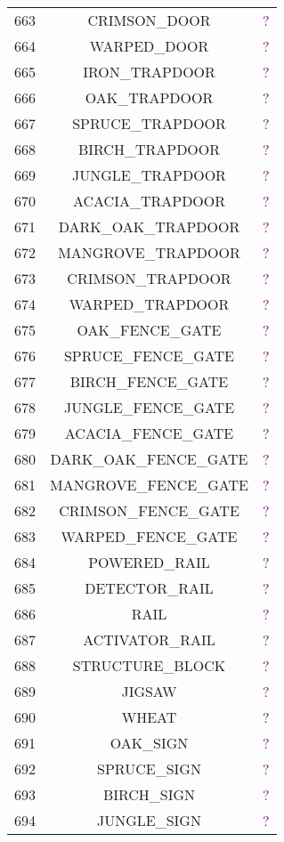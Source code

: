\documentclass[11pt]{article}
\newcommand\myworries[1]{\textcolor{purple}{#1}}
\begin{document}
\begin{longtable}{ |c|c|c| }
	663 & CRIMSON\_DOOR & \myworries{?} \\
	664 & WARPED\_DOOR & \myworries{?} \\
	665 & IRON\_TRAPDOOR & \myworries{?} \\
	666 & OAK\_TRAPDOOR & \myworries{?} \\
	667 & SPRUCE\_TRAPDOOR & \myworries{?} \\
	668 & BIRCH\_TRAPDOOR & \myworries{?} \\
	669 & JUNGLE\_TRAPDOOR & \myworries{?} \\
	670 & ACACIA\_TRAPDOOR & \myworries{?} \\
	671 & DARK\_OAK\_TRAPDOOR & \myworries{?} \\
	672 & MANGROVE\_TRAPDOOR & \myworries{?} \\
	673 & CRIMSON\_TRAPDOOR & \myworries{?} \\
	674 & WARPED\_TRAPDOOR & \myworries{?} \\
	675 & OAK\_FENCE\_GATE & \myworries{?} \\
	676 & SPRUCE\_FENCE\_GATE & \myworries{?} \\
	677 & BIRCH\_FENCE\_GATE & \myworries{?} \\
	678 & JUNGLE\_FENCE\_GATE & \myworries{?} \\
	679 & ACACIA\_FENCE\_GATE & \myworries{?} \\
	680 & DARK\_OAK\_FENCE\_GATE & \myworries{?} \\
	681 & MANGROVE\_FENCE\_GATE & \myworries{?} \\
	682 & CRIMSON\_FENCE\_GATE & \myworries{?} \\
	683 & WARPED\_FENCE\_GATE & \myworries{?} \\
	684 & POWERED\_RAIL & \myworries{?} \\
	685 & DETECTOR\_RAIL & \myworries{?} \\
	686 & RAIL & \myworries{?} \\
	687 & ACTIVATOR\_RAIL & \myworries{?} \\
	688 & STRUCTURE\_BLOCK & \myworries{?} \\
	689 & JIGSAW & \myworries{?} \\
	690 & WHEAT & \myworries{?} \\
	691 & OAK\_SIGN & \myworries{?} \\
	692 & SPRUCE\_SIGN & \myworries{?} \\
	693 & BIRCH\_SIGN & \myworries{?} \\
	694 & JUNGLE\_SIGN & \myworries{?} \\

\end{longtable}
\end{document}
